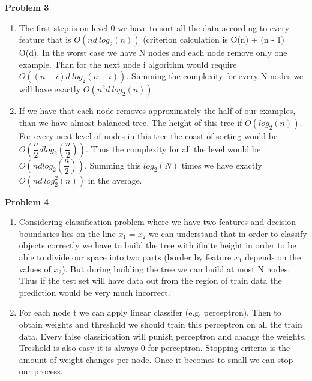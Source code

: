 \documentclass[12pt]{article}
\begin{document}
	\textbf{Problem 3}
		\begin{enumerate}
			\item
				The first step is on level 0 we have to sort all the data according to every feature  that is $O(n d\  log_2(n))$ (criterion calculation is O(n) + (n - 1) O(d). In the worst case we have N nodes and each node remove only one example. Than for the next node i algorithm would require $O\left((n - i) d\  log_2\left(n - i\right)\right)$. Summing the complexity for every N nodes we will have exactly $O(n^2 d\  log_2(n))$.
			\item
				If we have that each node removes approximately the half of our examples, than we have almost balanced tree. The height of this tree if $O(log_2(n))$. For every next level of nodes in this tree the coast of sorting would be $O\left( \dfrac{n}{2} d log_2\left( \dfrac{n}{2} \right) \right)$. Thus the complexity for all the level would be $O\left( n d log_2\left( \dfrac{n}{2} \right) \right)$. Summing this $log_2(N)$ times we have exactly $O(n d\  log^2_2(n))$ in the average.
		\end{enumerate}
		
	\textbf{Problem 4}
		\begin{enumerate}
			\item
				Considering classification problem where we have two features and decision boundaries lies on the line $x_1 = x_2$ we can understand that in order to classify objects correctly we have to build the tree with ifinite height in order to be able to divide our space into two parts (border by feature $x_1$ depends on the values of $x_2$). But during building the tree we can build at most N nodes. Thus if the test set will have data out from the region of train data the prediction would be very much incorrect.
			\item
				For each node t we can apply linear classifer (e.g. perceptron). Then to obtain weights and threshold we should train this perceptron on all the train data. Every false classification will punish perceptron and change the weights. Treshold is also easy it is always 0 for perceptron. Stopping criteria is the amount of weight changes per node. Once it becomes to small we can stop our process. 
		\end{enumerate}
\end{document}

